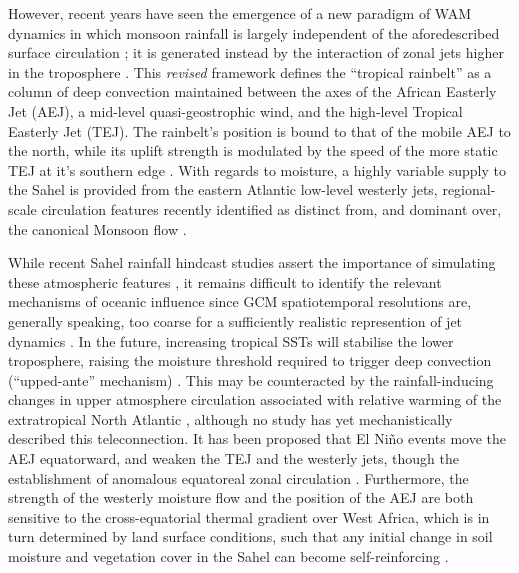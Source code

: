 \documentclass[a4paper]{article}
\begin{document}
However, recent years have seen the emergence of a new paradigm of WAM dynamics in which monsoon rainfall is largely independent of the aforedescribed surface circulation \parencite{grist2001study}; it is generated instead by the interaction of zonal jets higher in the troposphere \parencite[see][for a comprehensive overview]{nicholson2009revised}.
This \emph{revised} framework defines the ``tropical rainbelt'' as a column of deep convection maintained between the axes of the African Easterly Jet (AEJ), a mid-level quasi-geostrophic wind, and the high-level Tropical Easterly Jet (TEJ).
The rainbelt's position is bound to that of the mobile AEJ to the north, while its uplift strength is modulated by the speed of the more static TEJ at it's southern edge \parencite{gu2004seasonal, nicholson2009revised, nicholson2013west}.
With regards to moisture, a highly variable supply to the Sahel is provided from the eastern Atlantic low-level westerly jets, regional-scale circulation features recently identified as distinct from, and dominant over, the canonical Monsoon flow \parencite{grodsky2003near, pu2010dynamics, nicholson2013west}.

While recent Sahel rainfall hindcast studies assert the importance of simulating these atmospheric features \parencite{philippon2010skill, xue2010intercomparison, ruti2011west, diallo2013interannual}, it remains difficult to identify the relevant mechanisms of oceanic influence since GCM spatiotemporal resolutions are, generally speaking, too coarse for a sufficiently realistic represention of jet dynamics \parencite{caminade2010twentieth, druyan2011studies, tseng2016diagnosing, vellinga2016sahel, whittleston2017climate}.
In the future, increasing tropical SSTs will stabilise the lower troposphere, raising the moisture threshold required to trigger deep convection (``upped-ante'' mechanism) \parencite{neelin2003tropical, caminade2010twentieth, liu2014atmospheric}. 
This may be counteracted by the rainfall-inducing changes in upper atmosphere circulation associated with relative warming of the extratropical North Atlantic \parencite{liu2014atmospheric, martin2014impact, park2015northern, monerie2016range}, although no study has yet mechanistically described this teleconnection.
It has been proposed that El Ni\~{n}o events move the AEJ equatorward, and weaken the TEJ and the westerly jets, though the establishment of anomalous equatoreal zonal circulation \parencite{joly2009influence, okonkwo2015combined, villamayor2015robust, preethi2015impacts}.
Furthermore, the strength of the westerly moisture flow and the position of the AEJ are both sensitive to the cross-equatorial thermal gradient over West Africa, which is in turn determined by land surface conditions, such that any initial change in soil moisture and vegetation cover in the Sahel can become self-reinforcing \parencite{cook1999generation, thorncroft1999maintenance, patricola2008atmosphere, pu2012role, liu2014atmospheric, berg2017soil}.
\end{document}
